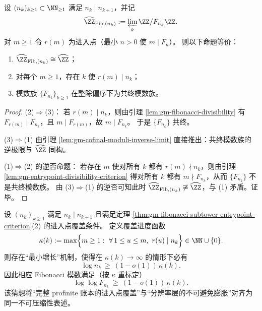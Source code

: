 \begin{theorem}\label{thm:gm-fibonacci-subtower-entrypoint-criterion}
设 \((n_k)_{k\ge 1}\subset\NN_{\ge 1}\) 满足 \(n_k\mid n_{k+1}\)，并记
\[
\widehat{\ZZ}_{\mathrm{Fib},(n_k)}:=\varprojlim_k \ZZ/F_{n_k}\ZZ.
\]
对 \(m\ge 1\) 令 \(r(m)\) 为进入点（最小 \(n>0\) 使 \(m\mid F_n\)）。
则以下命题等价：
\begin{enumerate}
  \item \(\widehat{\ZZ}_{\mathrm{Fib},(n_k)}\cong\widehat{\ZZ}\)；
  \item 对每个 \(m\ge 1\)，存在 \(k\) 使 \(r(m)\mid n_k\)；
  \item 模数族 \(\{F_{n_k}\}_{k\ge 1}\) 在整除偏序下为共终模数族。
\end{enumerate}
\end{theorem}
\begin{proof}
(2)\(\Rightarrow\)(3)：
若 \(r(m)\mid n_k\)，则由引理 \ref{lem:gm-fibonacci-divisibility} 有 \(F_{r(m)}\mid F_{n_k}\)，且 \(m\mid F_{r(m)}\)，故 \(m\mid F_{n_k}\)。
于是 \(\{F_{n_k}\}\) 共终。
\par
(3)\(\Rightarrow\)(1) 由引理 \ref{lem:gm-cofinal-moduli-inverse-limit} 直接推出：共终模数族的逆极限与 \(\widehat{\ZZ}\) 同构。
\par
(1)\(\Rightarrow\)(2) 的逆否命题：
若存在 \(m\) 使对所有 \(k\) 都有 \(r(m)\nmid n_k\)，则由引理 \ref{lem:gm-entrypoint-divisibility-criterion} 得对所有 \(k\) 都有 \(m\nmid F_{n_k}\)，从而 \(\{F_{n_k}\}\) 不是共终模数族。
由 (3)\(\Rightarrow\)(1) 的逆否可知此时 \(\widehat{\ZZ}_{\mathrm{Fib},(n_k)}\not\cong \widehat{\ZZ}\)，与 (1) 矛盾。证毕。
\end{proof}

\begin{conjecture}[进入点覆盖链的最小增长与不可压缩性]\label{conj:gm-entrypoint-min-growth}
设 \((n_k)_{k\ge 1}\) 满足 \(n_k\mid n_{k+1}\) 且满足定理 \ref{thm:gm-fibonacci-subtower-entrypoint-criterion}(2) 的进入点覆盖条件。
定义覆盖进度函数
\[
\kappa(k):=\max\Bigl\{m\ge 1:\ \forall\,1\le u\le m,\ r(u)\mid n_k\Bigr\}\in\NN\cup\{0\}.
\]
则存在“最小增长”机制，使得在 \(\kappa(k)\to\infty\) 的情形下必有
\[
\log n_k\ \ge\ (1-o(1))\,\kappa(k).
\]
因此相应 Fibonacci 模数满足（按 \(\kappa\) 重标定）
\[
\log\log F_{n_k}\ \ge\ (1-o(1))\,\kappa(k).
\]
该猜想将“完整 profinite 账本的进入点覆盖”与“分辨率层的不可避免膨胀”对齐为同一不可压缩性表述。
\end{conjecture}

